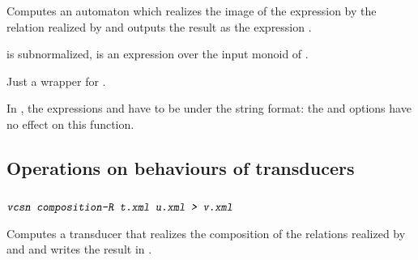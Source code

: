 \medskip 
\subsubsection{}

\begin{SwClCmd}
%
\end{SwClCmd}%
\begin{SwClTxt}
    Computes an automaton which realizes the 
    image of the expression  by the relation 
    realized by  and outputs the result as the expression 
    . 
\end{SwClTxt}%


\Prec {} is subnormalized,  is an expression
 over the input monoid of .

%

\Comt
Just a wrapper for .

\Cave
In \tafkitv, the expressions  and  have to be under 
the string format: the  and  options have no effect 
on this function.


%



\subsection{Operations on behaviours of transducers}

\subsubsection{}

\begin{SwClCmd}
\begin{shell}
$ 
$
\end{shell}%
\end{SwClCmd}%
\begin{SwClTxt}
    Computes a transducer that realizes the composition of the 
    relations realized by  
     and  and writes the result in  
    . 
\end{SwClTxt}%


